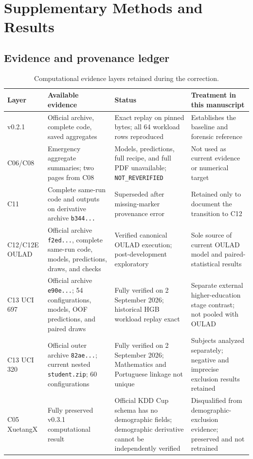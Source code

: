 \documentclass[education,supfile,submit,moreauthors]{Definitions/mdpi}
\begin{document}
\section{Supplementary Methods and Results}

\subsection{Evidence and provenance ledger}

\begin{table}[H]
\centering
\caption{Computational evidence layers retained during the correction.}
\label{tab:s_provenance}
\small
\begin{tabularx}{\textwidth}{>{\raggedright\arraybackslash}p{} >{\raggedright\arraybackslash}p{} >{\raggedright\arraybackslash}p{} X}
\toprule
Layer & Available evidence & Status & Treatment in this manuscript \\
\midrule
v0.2.1 & Official archive, complete code, saved aggregates & Exact replay on pinned bytes; all 64 workload rows reproduced & Establishes the baseline and forensic reference \\
C06/C08 & Emergency aggregate summaries; two pages from C08 & Models, predictions, full recipe, and full PDF unavailable; \texttt{NOT\_REVERIFIED} & Not used as current evidence or numerical target \\
C11 & Complete same-run code and outputs on derivative archive \texttt{b344...} & Superseded after missing-marker provenance error & Retained only to document the transition to C12 \\
C12/C12E OULAD & Official archive \texttt{f2ed...}, complete same-run code, models, predictions, draws, and checks & Verified canonical OULAD execution; post-development exploratory & Sole source of current OULAD model and paired-statistical results \\
C13 UCI 697 & Official archive \texttt{e90e...}; 54 configurations, models, OOF predictions, and paired draws & Fully verified on 2 September 2026; historical HGB workload replay exact & Separate external higher-education stage contrast; not pooled with OULAD \\
C13 UCI 320 & Official outer archive \texttt{82ae...}; current nested \texttt{student.zip}; 60 configurations & Fully verified on 2 September 2026; Mathematics and Portuguese linkage not unique & Subjects analyzed separately; negative and imprecise exclusion results retained \\
C05 XuetangX & Fully preserved v0.3.1 computational result & Official KDD Cup schema has no demographic fields; demographic derivative cannot be independently verified & Disqualified from demographic-exclusion evidence; preserved and not retrained \\
\bottomrule
\end{tabularx}
\end{table}
\FloatBarrier
\end{document}
